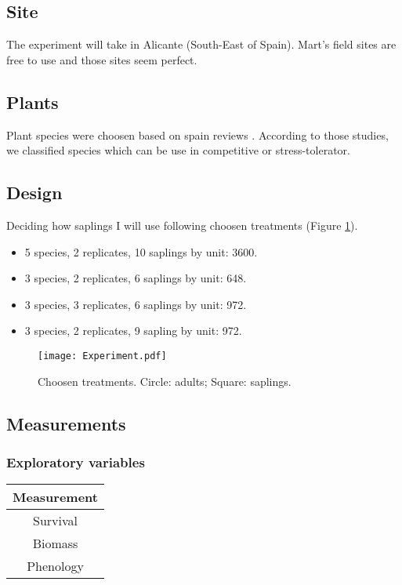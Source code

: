 \documentclass[12pt]{article} %
\begin{document}
\subsection{Site}

The experiment will take in Alicante (South-East of Spain). Mart's field sites are free to use and those sites seem perfect.

\subsection{Plants}

Plant species were choosen based on spain reviews \citep{McCluney2012,Navarro2006, Jauffret2003}. According to those studies, we classified species which can be use in competitive or stress-tolerator.



\subsection{Design}

Deciding how saplings I will use following choosen treatments (Figure \ref{exp}).

\begin{itemize}
\item 5 species, 2 replicates, 10 saplings by unit: 3600.
\item 3 species, 2 replicates, 6 saplings by unit: 648.
\item 3 species, 3 replicates, 6 saplings by unit: 972.
\item 3 species, 2 replicates, 9 sapling by unit: 972.
\end{itemize}


\begin{figure} %
\begin{center}
\texttt{[image: Experiment.pdf]}
\end{center}
\caption{Choosen treatments. Circle: adults; Square: saplings. \label{exp}}
\end{figure}


\subsection{Measurements}

\subsubsection{Exploratory variables}
\begin{tabular}{c}
Measurement \\ 
\hline
Survival \\ 
Biomass \\ 
Phenology \\ 

\hline 
\end{tabular}
\end{document}
